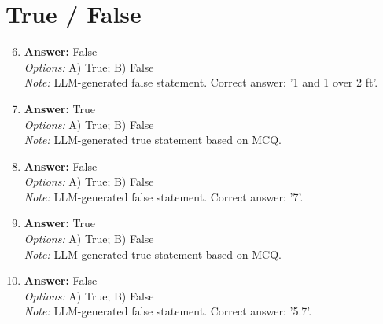 \documentclass[12pt]{article}
\begin{document}
\section*{True / False}
\begin{enumerate}[label=\arabic*.]
\setcounter{enumi}{5}
\item \textbf{Answer:} False
\\ \textit{Options:} A) True; B) False
\\ \textit{Note:} LLM-generated false statement. Correct answer: '1 and 1 over 2 ft'.
\item \textbf{Answer:} True
\\ \textit{Options:} A) True; B) False
\\ \textit{Note:} LLM-generated true statement based on MCQ.
\item \textbf{Answer:} False
\\ \textit{Options:} A) True; B) False
\\ \textit{Note:} LLM-generated false statement. Correct answer: '7'.
\item \textbf{Answer:} True
\\ \textit{Options:} A) True; B) False
\\ \textit{Note:} LLM-generated true statement based on MCQ.
\item \textbf{Answer:} False
\\ \textit{Options:} A) True; B) False
\\ \textit{Note:} LLM-generated false statement. Correct answer: '5.7'.
\end{enumerate}
\end{document}
